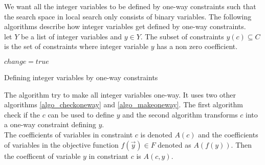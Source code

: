 We want all the integer variables to be defined by one-way constraints such that the search space in local search only 
consists of binary variables. The following algorithms describe how integer variables get defined by one-way 
constraints. \\ 
let $Y$ be a list of integer variables and $y \in Y$. The subset of constraints $y(c) \subseteq C$ is the set 
of constraints where integer variable $y$ has a non zero coefficient. \\ 
\IncMargin{1em}
\begin{algorithm}[H]

\algdata 
{}
\BlankLine
\Bool $change = true$\;
\caption{Defining integer variables by one-way constraints}\label{algo_defintvar}
\end{algorithm}\DecMargin{1em}
\noindent
The algorithm try to make all integer variables one-way. It uses two other algorithms 
\ref{algo_checkoneway} and \ref{algo_makeoneway}. The first algorithm check if the 
\cons $c$ can be used to define \var $y$ and the second algorithm transforms $c$ into a one-way constraint defining 
$y$.  \\ 
The coefficients of variables in constraint $c$ is denoted $A(c)$ and the coefficients of variables in the objective 
function $f(\vec{y}) \in F$ denoted as $A(f(y))$.   Then the coefficent of 
variable $y$ in constriant $c$ is $A(c,y)$. \\  

